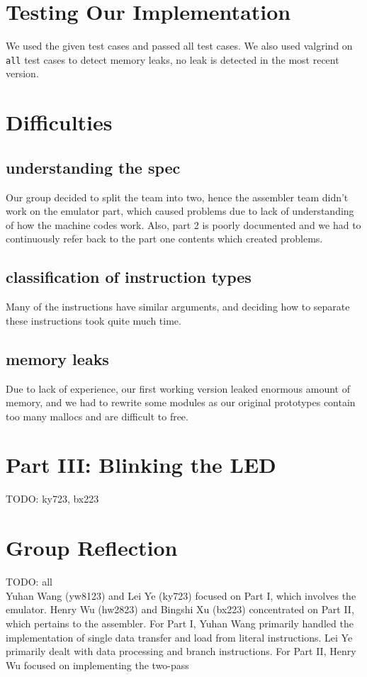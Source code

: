 \documentclass[11pt]{article}
\begin{document}
\section{Testing Our Implementation}

We used the given test cases and passed all test cases. We also used valgrind
on \texttt{all} test cases to detect memory leaks, no leak is detected in the
most recent version.

\section{Difficulties}
\subsection{understanding the spec}
Our group decided to split the team into two, hence the assembler team didn't
work on the emulator part, which caused problems due to lack of understanding
of how the machine codes work. Also, part 2 is poorly documented and we had to
continuously refer back to the part one contents which created problems.
\subsection{classification of instruction types}
Many of the instructions have similar arguments, and deciding how to separate
these instructions took quite much time.
\subsection{memory leaks}
Due to lack of experience, our first working version leaked enormous amount of
memory, and we had to rewrite some modules as our original prototypes contain
too many mallocs and are difficult to free.

\section{Part III: Blinking the LED}
TODO: ky723, bx223

\section{Group Reflection}

TODO: all\\ Yuhan Wang (yw8123) and Lei Ye (ky723) focused on Part I, which
involves the emulator. Henry Wu (hw2823) and Bingshi Xu (bx223) concentrated on
Part II, which pertains to the assembler. For Part I, Yuhan Wang primarily
handled the implementation of single data transfer and load from literal
instructions. Lei Ye primarily dealt with data processing and branch
instructions. For Part II, Henry Wu focused on implementing the two-pass
\end{document}
